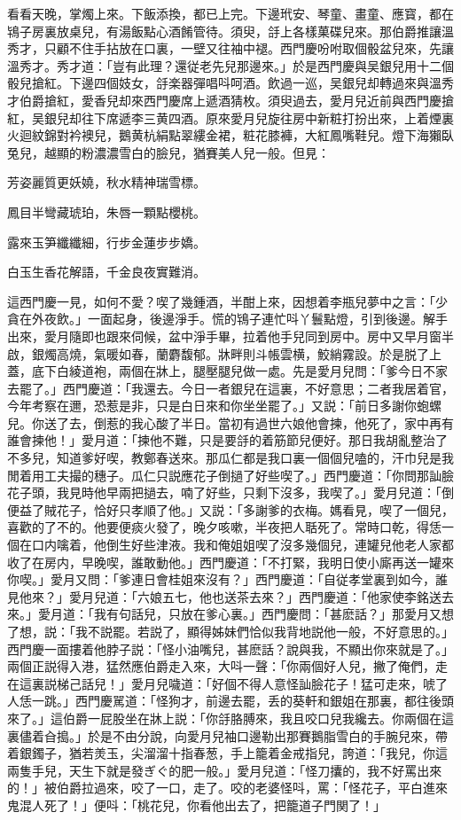 看看天晚，掌燭上來。下飯添換，都已上完。下邊玳安、琴童、畫童、應寳，都在鴇子房裏放桌兒，有湯飯點心酒餚管待。須臾，㧱上各樣菓碟兒來。那伯爵推讓溫秀才，只顧不住手拈放在口裏，一壁又往袖中褪。西門慶吩咐取個骰盆兒來，先讓溫秀才。秀才道：「豈有此理？還従老先兒那邊來。」於是西門慶與吴銀兒用十二個骰兒搶紅。下邊四個妓女，㧱楽器彈唱呌呵酒。飲過一巡，吴銀兒却轉過來與溫秀才伯爵搶紅，愛香兒却來西門慶席上遞酒猜枚。須臾過去，愛月兒近前與西門慶搶紅，吴銀兒却往下席遞李三黄四酒。原來愛月兒旋往房中新粧打扮出來，上着煙裏火迴紋錦對衿襖兒，鵝黄杭絹點翠縷金裙，粧花膝褲，大紅鳳嘴鞋兒。燈下海獺臥兔兒，越顯的粉濃濃雪白的臉兒，猶賽美人兒一般。但見：

\begin{myquote}
芳姿麗質更妖嬈，秋水精神瑞雪標。

鳳目半彎藏琥珀，朱唇一顆點櫻桃。

露來玉笋纖纖細，行步金蓮步步嬌。

白玉生香花解語，千金良夜實難消。
\end{myquote}

這西門慶一見，如何不愛？喫了幾鍾酒，半酣上來，因想着李瓶兒夢中之言：「少貪在外夜飲。」一面起身，後邊淨手。慌的鴇子連忙呌丫鬟點燈，引到後邊。解手出來，愛月隨即也跟來伺候，盆中淨手畢，拉着他手兒同到房中。房中又早月窗半啟，銀燭高燒，氣暖如春，蘭麝馥郁。牀畔則斗帳雲横，鮫綃霧設。於是脱了上蓋，底下白綾道袍，兩個在牀上，腿壓腿兒做一處。先是愛月兒問：「爹今日不家去罷了。」西門慶道：「我還去。今日一者銀兒在這裏，不好意思；二者我居着官，今年考察在邇，恐惹是非，只是白日來和你坐坐罷了。」又説：「前日多謝你蚫螺兒。你送了去，倒惹的我心酸了半日。當初有過世六娘他會揀，他死了，家中再有誰會揀他！」愛月道：「揀他不難，只是要㧱的着筋節兒便好。那日我胡亂整治了不多兒，知道爹好喫，教鄭春送來。那瓜仁都是我口裏一個個兒嗑的，汗巾兒是我閒着用工夫撮的穗子。瓜仁只説應花子倒撾了好些喫了。」西門慶道：「你問那訕臉花子頭，我見時他早兩把撾去，喃了好些，只剩下沒多，我喫了。」愛月兒道：「倒便益了賊花子，恰好只孝順了他。」又説：「多謝爹的衣梅。媽看見，喫了一個兒，喜歡的了不的。他要便痰火發了，晚夕咳嗽，半夜把人聒死了。常時口乾，得恁一個在口内噙着，他倒生好些津液。我和俺姐姐喫了沒多幾個兒，連罐兒他老人家都收了在房内，早晚喫，誰敢動他。」西門慶道：「不打緊，我明日使小廝再送一罐來你喫。」愛月又問：「爹連日會桂姐來沒有？」西門慶道：「自従孝堂裏到如今，誰見他來？」愛月兒道：「六娘五七，他也送茶去來？」西門慶道：「他家使李銘送去來。」愛月道：「我有句話兒，只放在爹心裏。」西門慶問：「甚麽話？」那愛月又想了想，説：「我不説罷。若説了，顯得姊妹們恰似我背地説他一般，不好意思的。」西門慶一面摟着他脖子説：「怪小油嘴兒，甚麽話？說與我，不顯出你來就是了。」　兩個正説得入港，猛然應伯爵走入來，大呌一聲：「你兩個好人兒，撇了俺們，走在這裏説梯己話兒！」愛月兒噦道：「好個不得人意怪訕臉花子！猛可走來，唬了人恁一跳。」西門慶駡道：「怪狗才，前邊去罷，丢的葵軒和銀姐在那裏，都往後頭來了。」這伯爵一屁股坐在牀上説：「你㧱胳膊來，我且咬口兒我纔去。你兩個在這裏儘着㒲搗。」於是不由分說，向愛月兒袖口邊勒出那賽鵝脂雪白的手腕兒來，帶着銀鐲子，猶若羙玉，尖溜溜十指春葱，手上籠着金戒指兒，誇道：「我兒，你這兩隻手兒，天生下就是發ぎぐ的肥一般。」愛月兒道：「怪刀攮的，我不好罵出來的！」被伯爵拉過來，咬了一口，走了。咬的老婆怪呌，罵：「怪花子，平白進來鬼混人死了！」便呌：「桃花兒，你看他出去了，把籠道子門関了！」

